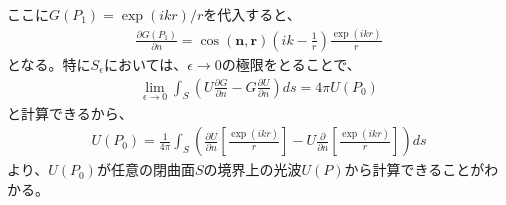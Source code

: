 \documentclass[a4paper,11pt,uplatex]{jsbook}
\begin{document}
ここに$G(P_1) = \exp(ikr)/r$を代入すると、
\begin{eqnarray}
  \frac{\partial G(P_1)}{\partial n} = \cos(\bm{n},\bm{r})\left(ik - \frac{1}{r}\right)\frac{\exp(ikr)}{r}
\end{eqnarray}
となる。特に$S_\epsilon$においては、$\epsilon \rightarrow 0$の極限をとることで、
\begin{eqnarray}
  \lim_{\epsilon \rightarrow 0} \int_S \left( U\frac{\partial G}{\partial n} - G\frac{\partial U}{\partial n}\right)ds
   =4\pi U(P_0)
\end{eqnarray}
と計算できるから、
\begin{eqnarray}
  U(P_0) = \frac{1}{4\pi}\int_S \left( \frac{\partial U}{\partial n} \left[ \frac{\exp(ikr)}{r} \right] - U\frac{\partial}{\partial n} \left[ \frac{\exp(ikr)}{r}\right] \right) ds
\end{eqnarray}
より、$U(P_0)$が任意の閉曲面$S$の境界上の光波$U(P)$から計算できることがわかる。
\end{document}

